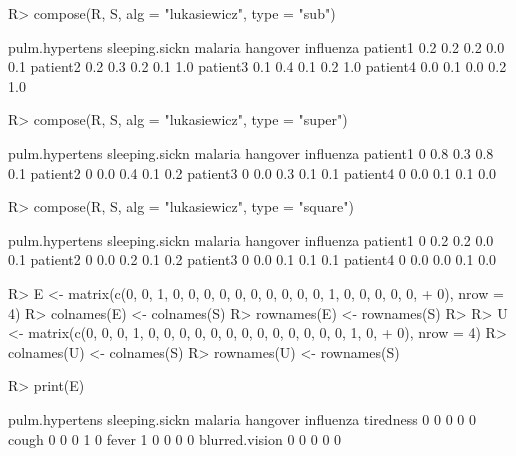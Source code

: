 \documentclass{article}\usepackage[]{graphicx}\usepackage[]{color}
\begin{document}
\begin{Schunk}
% --begin: "comp.subsupsquare"
\begin{Sinput}
R> compose(R, S, alg = "lukasiewicz", type = "sub")
\end{Sinput}
\begin{Soutput}
         pulm.hypertens sleeping.sickn malaria hangover influenza
patient1            0.2            0.2     0.2      0.0       0.1
patient2            0.2            0.3     0.2      0.1       1.0
patient3            0.1            0.4     0.1      0.2       1.0
patient4            0.0            0.1     0.0      0.2       1.0
\end{Soutput}
\begin{Sinput}
R> compose(R, S, alg = "lukasiewicz", type = "super")
\end{Sinput}
\begin{Soutput}
         pulm.hypertens sleeping.sickn malaria hangover influenza
patient1              0            0.8     0.3      0.8       0.1
patient2              0            0.0     0.4      0.1       0.2
patient3              0            0.0     0.3      0.1       0.1
patient4              0            0.0     0.1      0.1       0.0
\end{Soutput}
\begin{Sinput}
R> compose(R, S, alg = "lukasiewicz", type = "square")
\end{Sinput}
\begin{Soutput}
         pulm.hypertens sleeping.sickn malaria hangover influenza
patient1              0            0.2     0.2      0.0       0.1
patient2              0            0.0     0.2      0.1       0.2
patient3              0            0.0     0.1      0.1       0.1
patient4              0            0.0     0.0      0.1       0.0
\end{Soutput}
%
% --end: "comp.subsupsquare"
\end{Schunk}

\begin{Schunk}
\begin{Sinput}
R> E <- matrix(c(0, 0, 1, 0, 0, 0, 0, 0, 0, 0, 0, 0, 0, 1, 0, 0, 0, 0, 0, 
+      0), nrow = 4)
R> colnames(E) <- colnames(S)
R> rownames(E) <- rownames(S)
R> 
R> U <- matrix(c(0, 0, 0, 1, 0, 0, 0, 0, 0, 0, 0, 0, 0, 0, 0, 0, 0, 1, 0, 
+      0), nrow = 4)
R> colnames(U) <- colnames(S)
R> rownames(U) <- rownames(S)
\end{Sinput}
\end{Schunk}

\begin{Schunk}
% --begin: "comp.e"
\begin{Sinput}
R> print(E)
\end{Sinput}
\begin{Soutput}
               pulm.hypertens sleeping.sickn malaria hangover influenza
tiredness                   0              0       0        0         0
cough                       0              0       0        1         0
fever                       1              0       0        0         0
blurred.vision              0              0       0        0         0
\end{Soutput}
%
% --end: "comp.e"
\end{Schunk}
\end{document}
